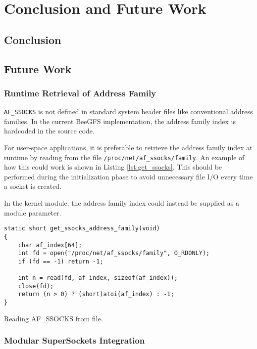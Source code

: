 \chapter{Conclusion and Future Work}

\section{Conclusion}

\section{Future Work}

\subsection{Runtime Retrieval of Address Family}

\texttt{AF\_SSOCKS} is not defined in standard system header files like conventional address families. In the current BeeGFS implementation, the address family index is hardcoded in the source code. 

For user-space applications, it is preferable to retrieve the address family index at runtime by reading from the file \texttt{/proc/net/af\_ssocks/family}. An example of how this could work is shown in Listing \ref{lst:get_ssocks}. This should be performed during the initialization phase to avoid unnecessary file I/O every time a socket is created.

In the kernel module, the address family index could instead be supplied as a module parameter.

\begin{listing}[H]
\begin{verbatim}
static short get_ssocks_address_family(void)
{
    char af_index[64];
    int fd = open("/proc/net/af_ssocks/family", O_RDONLY);
    if (fd == -1) return -1;

    int n = read(fd, af_index, sizeof(af_index));
    close(fd);
    return (n > 0) ? (short)atoi(af_index) : -1;
}
\end{verbatim}
\caption{Reading AF\_SSOCKS from file.}
\end{listing}

\subsection{Modular SuperSockets Integration}

